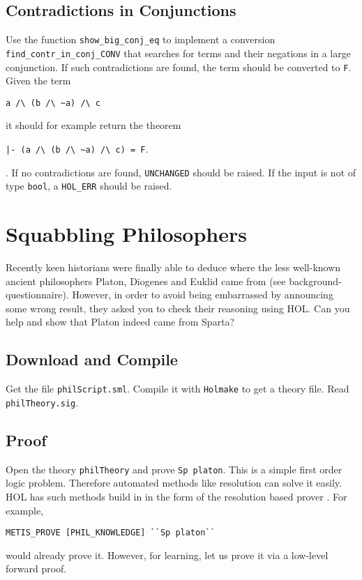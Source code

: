 \documentclass[a4paper,10pt,oneside]{scrartcl}
\begin{document}
\subsection{Contradictions in Conjunctions}
Use the function \texttt{show\_big\_conj\_eq} to implement a conversion \texttt{find\_contr\_in\_conj\_CONV} that searches for terms and their negations in a large conjunction. If such contradictions are found, the term should be converted to \texttt{F}. 
Given the term \begin{center}\verb#a /\ (b /\ ~a) /\ c#
\end{center}
it should for example return the theorem
\begin{center}
\verb#|- (a /\ (b /\ ~a) /\ c) = F#.
\end{center}.
If no contradictions are found, \texttt{UNCHANGED} should be raised. If the input is not of type
\texttt{bool}, a \texttt{HOL\_ERR} should be raised.


\section{Squabbling Philosophers}

Recently keen historians were finally able to deduce where the less well-known ancient philosophers
Platon, Diogenes and Euklid came from (see background-questionnaire). However, in order to avoid being embarrassed by announcing some wrong result, they asked you to check their reasoning using HOL.
Can you help and show that Platon indeed came from Sparta?

\subsection{Download and Compile}
Get the file \texttt{philScript.sml}. Compile it with \texttt{Holmake} to get a theory file. Read \texttt{philTheory.sig}.

\subsection{Proof}
Open the theory \texttt{philTheory} and prove \verb#Sp platon#. This is a simple first order logic problem. Therefore automated methods like resolution can solve it easily. HOL has such methods build in in the form of \eg the resolution based prover . For example, 
\begin{center}
\verb#METIS_PROVE [PHIL_KNOWLEDGE] ``Sp platon``#
\end{center}
would already prove it. However, for learning, let us prove it via a low-level forward proof.
\end{document}
